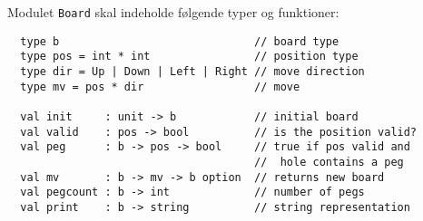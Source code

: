 Modulet \lstinline{Board} skal indeholde følgende typer og funktioner:
\begin{lstlisting}
  type b                              // board type
  type pos = int * int                // position type
  type dir = Up | Down | Left | Right // move direction
  type mv = pos * dir                 // move

  val init     : unit -> b            // initial board
  val valid    : pos -> bool          // is the position valid?
  val peg      : b -> pos -> bool     // true if pos valid and
                                      //  hole contains a peg
  val mv       : b -> mv -> b option  // returns new board
  val pegcount : b -> int             // number of pegs
  val print    : b -> string          // string representation
\end{lstlisting}

